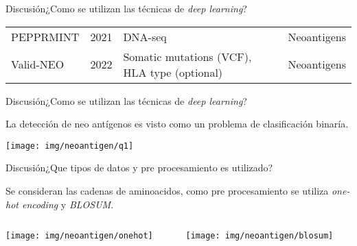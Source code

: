 \documentclass[10pt]{beamer}
\newcommand{\1}{
	\setbeamertemplate{background}{
		\texttt{[image: img/1]}
		\tikz[overlay] \fill[fill opacity=0.75,fill=white] (0,0) rectangle (-\paperwidth,\paperheight);
	}
}
\begin{document}
\begin{frame}{Discusión}{¿Como se utilizan las técnicas de \textit{deep learning}?}
\begin{table}[]
{\begin{tabular}{lp{1.2cm}p{2.5cm}p{2.5cm}}
				PEPPRMINT         & 2021 \cite{zhou2021prioritizing}         & DNA-seq                                                  & Neoantigens                                        \\
				
				Valid-NEO       & 2022 \cite{terai2022valid}             & Somatic mutations (VCF), HLA type (optional)          & Neoantigens                                       
			\end{tabular}
		}
	\end{table}	
\end{frame}


\begin{frame}{Discusión}{¿Como se utilizan las técnicas de \textit{deep learning}? }
	\begin{block}{}
		 La detección de neo antígenos es visto como un problema de clasificación binaría.
	\end{block}

	\vspace*{0.5cm}

	\centering
	\texttt{[image: img/neoantigen/q1]}
	
\end{frame}



\begin{frame}{Discusión}{¿Que tipos de datos y pre procesamiento es utilizado?}
	\begin{block}{}
		Se consideran las cadenas de aminoacidos, como pre procesamiento se utiliza \textit{one-hot encoding} y \textit{BLOSUM}.
	\end{block}
	
	\vspace*{0.5cm}
	\centering
\begin{columns}	
		
	\begin{column}{0.48\textwidth}
		\centering
		\texttt{[image: img/neoantigen/onehot]}
	\end{column}
	
	\begin{column}{0.48\textwidth}
		\centering
		\texttt{[image: img/neoantigen/blosum]}
	\end{column}
\end{columns}		
	

	
\end{frame}
\end{document}
